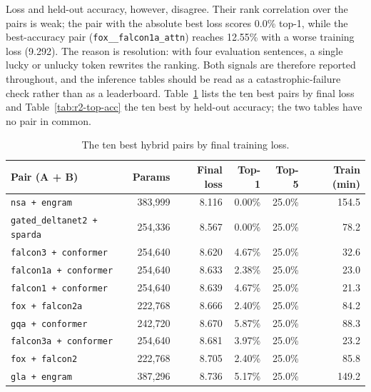 Loss and held-out accuracy, however, disagree. Their rank correlation over the pairs is weak; the pair with the absolute best loss scores 0.0\% top-1, while the best-accuracy pair (\texttt{fox\_\_falcon1a\_attn}) reaches 12.55\% with a worse training loss (9.292). The reason is resolution: with four evaluation sentences, a single lucky or unlucky token rewrites the ranking. Both signals are therefore reported throughout, and the inference tables should be read as a catastrophic-failure check rather than as a leaderboard. Table~\ref{tab:r2-top-loss} lists the ten best pairs by final loss and Table~\ref{tab:r2-top-acc} the ten best by held-out accuracy; the two tables have no pair in common.

\begin{table}[H]
\centering
\small
\caption{The ten best hybrid pairs by final training loss.}
\label{tab:r2-top-loss}
\begin{tabular}{lrrrrr}
\toprule
Pair (A + B) & Params & Final loss & Top-1 & Top-5 & Train (min) \\
\midrule
\texttt{nsa + engram}            & 383{,}999 & 8.116 & 0.00\% & 25.0\% & 154.5 \\
\texttt{gated\_deltanet2 + sparda} & 254{,}336 & 8.567 & 0.00\% & 25.0\% & 78.2 \\
\texttt{falcon3 + conformer}     & 254{,}640 & 8.620 & 4.67\% & 25.0\% & 32.6 \\
\texttt{falcon1a + conformer}    & 254{,}640 & 8.633 & 2.38\% & 25.0\% & 23.0 \\
\texttt{falcon1 + conformer}     & 254{,}640 & 8.639 & 4.67\% & 25.0\% & 21.3 \\
\texttt{fox + falcon2a}          & 222{,}768 & 8.666 & 2.40\% & 25.0\% & 84.2 \\
\texttt{gqa + conformer}         & 242{,}720 & 8.670 & 5.87\% & 25.0\% & 88.3 \\
\texttt{falcon3a + conformer}    & 254{,}640 & 8.681 & 3.97\% & 25.0\% & 23.2 \\
\texttt{fox + falcon2}           & 222{,}768 & 8.705 & 2.40\% & 25.0\% & 85.8 \\
\texttt{gla + engram}            & 387{,}296 & 8.736 & 5.17\% & 25.0\% & 149.2 \\
\bottomrule
\end{tabular}
\end{table}

